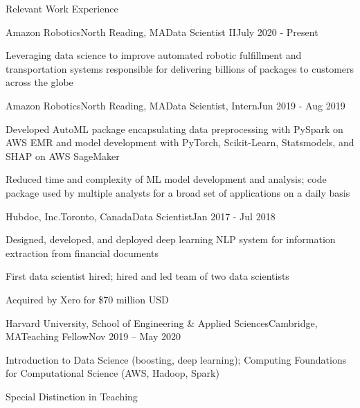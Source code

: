 \documentclass{resume} %
\begin{document}
\begin{rSection}{Relevant Work Experience}


\begin{rSubsection}{Amazon Robotics}{North Reading, MA}{Data Scientist II}{July 2020 - Present}

	\item Leveraging data science to improve automated robotic fulfillment and transportation systems responsible for delivering billions of packages to customers across the globe
    
\end{rSubsection}

\begin{rSubsection}{Amazon Robotics}{North Reading, MA}{Data Scientist, Intern}{Jun 2019 - Aug 2019}

	\item Developed AutoML package encapsulating data preprocessing with PySpark on AWS EMR and model development with PyTorch, Scikit-Learn, Statsmodels, and SHAP on AWS SageMaker
	\item Reduced time and complexity of ML model development and analysis; code package used by multiple analysts for a broad set of applications on a daily basis
    
\end{rSubsection}


\begin{rSubsection}{Hubdoc, Inc.}{Toronto, Canada}{Data Scientist}{Jan 2017 - Jul 2018}

	\item Designed, developed, and deployed deep learning NLP system for information extraction from financial documents
	\item First data scientist hired; hired and led team of two data scientists
	\item Acquired by Xero for \$70 million USD
	    
\end{rSubsection}


\begin{rSubsection}{Harvard University, School of Engineering \& Applied Sciences}{Cambridge, MA}{Teaching Fellow}{Nov 2019 -- May 2020}

\item Introduction to Data Science (boosting, deep learning); Computing Foundations for Computational Science (AWS, Hadoop, Spark)
\item Special Distinction in Teaching
    

\end{rSubsection}
\end{rSection}
\end{document}
